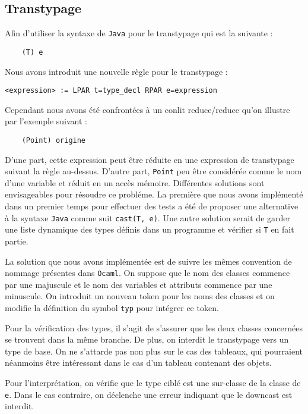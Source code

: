 \documentclass{article}
\begin{document}
\subsection{Transtypage}
Afin d'utiliser la syntaxe de \texttt{Java} pour le transtypage qui est la suivante : 
\begin{verbatim}
    (T) e
\end{verbatim}
Nous avons introduit une nouvelle règle pour le transtypage : 
\begin{lstlisting}[style=mystyle]
    <expression> := LPAR t=type_decl RPAR e=expression
\end{lstlisting}
Cependant nous avons été confrontées à un conlit reduce/reduce qu'on illustre par l'exemple suivant : 
\begin{verbatim}
    (Point) origine
\end{verbatim}
D'une part, cette expression peut être réduite en une expression de transtypage 
suivant la règle au-dessus. D'autre part, \texttt{Point} peu être considérée comme le nom d'une variable et réduit 
en un accès mémoire. Différentes solutions sont envisageables pour résoudre ce probléme. 
La première que nous avons implémenté dans un premier temps pour effectuer des tests a été de 
proposer une alternative à la syntaxe \texttt{Java} comme suit \texttt{cast(T, e)}.
Une autre solution serait de garder une liste dynamique des types définis dans un programme et vérifier si \texttt{T}
en fait partie.

La solution que nous avons implémentée est de suivre les mêmes convention de nommage présentes dans \texttt{Ocaml}.
On suppose que le nom des classes commence par une majuscule et le nom des variables et attributs commence par une minuscule.
On introduit un nouveau token pour les noms des classes et on modifie la définition du symbol \texttt{typ} pour intégrer ce token.

Pour la vérification des types, il s'agit de s'assurer que les deux classes concernées 
se trouvent dans la même branche. De plus, on interdit le transtypage vers un type de base.
On ne s'attarde pas non plus sur le cas des tableaux, qui pourraient néanmoins être intéressant dans le cas d'un tableau contenant des objets.

Pour l'interprétation, on vérifie que le type ciblé est une sur-classe de la classe de \texttt{e}. Dans le cas contraire, on déclenche 
une erreur indiquant que le downcast est interdit.
\end{document}
